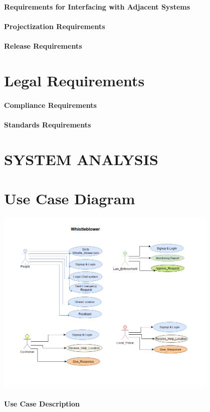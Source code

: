 \documentclass{article}
\begin{document}
\paragraph{Requirements for Interfacing with Adjacent Systems}
\paragraph{Projectization Requirements}
\paragraph{Release Requirements}

\newpage
\section{Legal Requirements}
\paragraph{Compliance Requirements}
\paragraph{Standards Requirements}

\newpage
\section{SYSTEM ANALYSIS}
\section{Use Case Diagram}
\includegraphics[width=0.8\textwidth]{Use_Case_Diagram.png}
\paragraph{Use Case Description}
\end{document}

